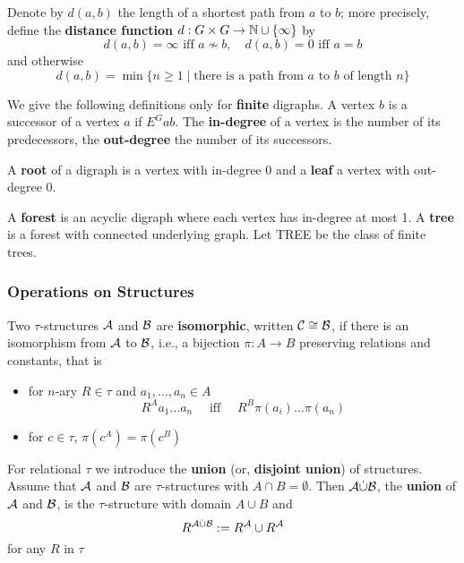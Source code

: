 \documentclass[11pt]{article}
\begin{document}
Denote by \(d(a,b)\) the length of a shortest path from \(a\) to \(b\); more
precisely, define the \textbf{distance function} \(d:G\times G\to\mathbb{N}\cup\{\infty\}\)
by
\begin{equation*}
d(a,b)=\infty\text{ iff }a\not\sim b,\quad d(a,b)=0\text{ iff }a=b
\end{equation*}
and otherwise
\begin{equation*}
d(a,b)=\min\{n\ge1\mid\text{there is a path from $a$ to $b$ of length $n$}\}
\end{equation*}

We give the following definitions only for \textbf{finite} digraphs. A vertex \(b\)
is a successor of a vertex \(a\) if \(E^Gab\). The \textbf{in-degree} of a vertex is
the number of its predecessors, the \textbf{out-degree} the number of its
successors.

A \textbf{root} of a digraph is a vertex with in-degree 0 and a \textbf{leaf} a vertex with
out-degree 0.

A \textbf{forest} is an acyclic digraph where each vertex has in-degree at most 1. A
\textbf{tree} is a forest with connected underlying graph. Let TREE be the class of
finite trees.

\subsubsection{Operations on Structures}
\label{sec:orgef84ee1}
Two \(\tau\)-structures \(\mathcal{A}\) and \(\mathcal{B}\) are \textbf{isomorphic}, written \(\mathcal{C}\cong\mathcal{B}\), if
there is an isomorphism from \(\mathcal{A}\) to \(\mathcal{B}\), i.e., a bijection \(\pi:A\to B\) preserving
relations and constants, that is
\begin{itemize}
\item for \(n\)-ary \(R\in \tau\) and \(a_1,\dots,a_n\in A\)
\begin{equation*}
R^Aa_1\dots a_n \quad\text{ iff }\quad
R^B\pi(a_i)\dots\pi(a_n)
\end{equation*}
\item for \(c\in\tau\), \(\pi(c^A)=\pi(c^B)\)
\end{itemize}


For relational \(\tau\) we introduce the \textbf{union} (or, \textbf{disjoint union}) of structures. Assume
that \(\mathcal{A}\) and \(\mathcal{B}\) are \(\tau\)-structures with \(A\cap B=\emptyset\).
Then \(\mathcal{A}\dot{\cup}\mathcal{B}\), the \textbf{union} of \(\mathcal{A}\) and \(\mathcal{B}\), is the \(\tau\)-structure
with domain \(A\cup B\) and
\begin{equation*}
R^{\mathcal{A}\dot\cup\mathcal{B}}:=R^{\mathcal{A}}\cup R^{\mathcal{A}}
\end{equation*}
for any \(R\) in \(\tau\)
\end{document}
